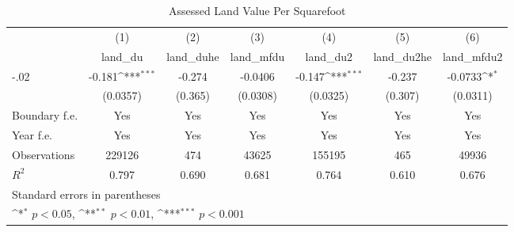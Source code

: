 \begin{table}[htbp]\centering
\def\sym#1{\ifmmode^{#1}\else\(^{#1}\)\fi}
\caption{Assessed Land Value Per Squarefoot}
\begin{tabular}{l*{6}{c}}
\hline\hline
                    &\multicolumn{1}{c}{(1)}&\multicolumn{1}{c}{(2)}&\multicolumn{1}{c}{(3)}&\multicolumn{1}{c}{(4)}&\multicolumn{1}{c}{(5)}&\multicolumn{1}{c}{(6)}\\
                    &\multicolumn{1}{c}{land\_du}&\multicolumn{1}{c}{land\_duhe}&\multicolumn{1}{c}{land\_mfdu}&\multicolumn{1}{c}{land\_du2}&\multicolumn{1}{c}{land\_du2he}&\multicolumn{1}{c}{land\_mfdu2}\\
\hline
-.02                &      -0.181\sym{***}&      -0.274         &     -0.0406         &      -0.147\sym{***}&      -0.237         &     -0.0733\sym{*}  \\
                    &    (0.0357)         &     (0.365)         &    (0.0308)         &    (0.0325)         &     (0.307)         &    (0.0311)         \\
[1em]
Boundary f.e.       &         Yes         &         Yes         &         Yes         &         Yes         &         Yes         &         Yes         \\
[1em]
Year f.e.           &         Yes         &         Yes         &         Yes         &         Yes         &         Yes         &         Yes         \\
\hline
Observations        &      229126         &         474         &       43625         &      155195         &         465         &       49936         \\
\(R^{2}\)           &       0.797         &       0.690         &       0.681         &       0.764         &       0.610         &       0.676         \\
\hline\hline
\multicolumn{7}{l}{\footnotesize Standard errors in parentheses}\\
\multicolumn{7}{l}{\footnotesize \sym{*} \(p<0.05\), \sym{**} \(p<0.01\), \sym{***} \(p<0.001\)}\\
\end{tabular}
\end{table}
